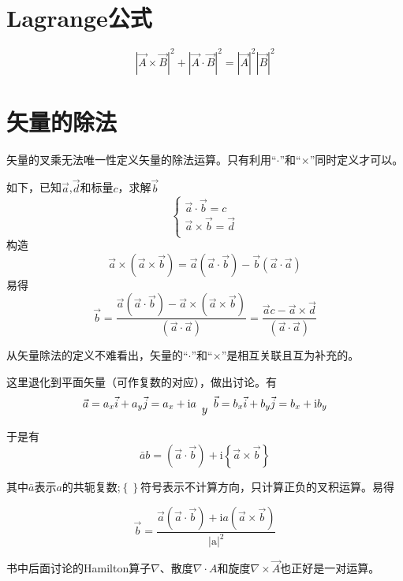 \section{Lagrange公式}
\[
\left| \vec{A}\times \vec{B} \right|^2+\left| \vec{A}\cdot \vec{B} \right|^2=\left| \vec{A} \right|^2\left| \vec{B} \right|^2
\]
\section{矢量的除法}

矢量的叉乘无法唯一性定义矢量的除法运算。只有利用“$\cdot$”和“$\times$”同时定义才可以。

如下，已知$\vec{a}$,$\vec{d}$和标量$c$，求解$\vec{b}$
\[
\begin{cases}
\vec{a}\cdot \vec{b}=c\\
\vec{a}\times \vec{b}=\vec{d}\\
\end{cases}
\]
构造
\[
\vec{a}\times \left( \vec{a}\times \vec{b} \right) =\vec{a}\left( \vec{a}\cdot \vec{b} \right) -\vec{b}\left( \vec{a}\cdot \vec{a} \right) 
\]
易得
\[
\vec{b}=\frac{\vec{a}\left( \vec{a}\cdot \vec{b} \right) -\vec{a}\times \left( \vec{a}\times \vec{b} \right)}{\left( \vec{a}\cdot \vec{a} \right)}=\frac{\vec{a}c-\vec{a}\times \vec{d}}{\left( \vec{a}\cdot \vec{a} \right)}
\]


从矢量除法的定义不难看出，矢量的“$\cdot$”和“$\times$”是相互关联且互为补充的。

这里退化到平面矢量（可作复数的对应），做出讨论。有
\[
\vec{a}=a_x\vec{i}+a_y\vec{j}=a_x+\text{i}a_{\begin{array}{c}
	y\\
	\end{array}}
\\
\vec{b}=b_x\vec{i}+b_y\vec{j}=b_x+\text{i}b_y
\]

于是有
\[
\bar{a}b=\left( \vec{a}\cdot \vec{b} \right) +\text{i}\left\{ \vec{a}\times \vec{b} \right\} 
\]

其中$\bar{a}$表示$a$的共轭复数;$\left\{\right\}$符号表示不计算方向，只计算正负的叉积运算。易得

\[
\vec{b}=\frac{\vec{a}\left( \vec{a}\cdot \vec{b} \right) +\text{i}a\left( \vec{a}\times \vec{b} \right)}{\left| \text{a} \right|^2}
\]

书中后面讨论的Hamilton算子$\nabla $、散度$\nabla\cdot A$和旋度$\nabla\times\vec{A}$也正好是一对运算。




